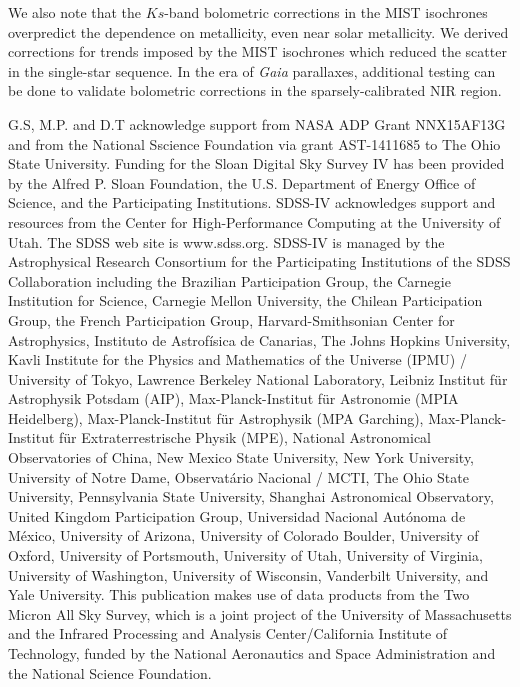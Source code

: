 \documentclass[twocolumn]{aastex6}
\newcommand{\Gaia}{\mbox{\textit{Gaia}}}
\begin{document}
We also note that the \(Ks\)-band bolometric corrections in the MIST 
isochrones overpredict the dependence on metallicity, even near solar 
metallicity. We derived corrections for trends imposed by the MIST isochrones 
which reduced the scatter in the single-star sequence. In the era of \Gaia{} 
parallaxes, additional testing can be done to validate bolometric corrections 
in the sparsely-calibrated NIR region.

\acknowledgments

G.S, M.P. and D.T acknowledge support from NASA ADP Grant NNX15AF13G and from
the National Sscience Foundation via grant AST-1411685 to The Ohio State
University. 
Funding for the Sloan Digital Sky Survey IV has been provided by the Alfred P.
Sloan Foundation, the U.S. Department of Energy Office of Science, and the
Participating Institutions. SDSS-IV acknowledges support and resources from the
Center for High-Performance Computing at the University of Utah. The SDSS web
site is www.sdss.org. SDSS-IV is managed by the Astrophysical Research
Consortium for the Participating Institutions of the SDSS Collaboration
including the Brazilian Participation Group, the Carnegie Institution for
Science, Carnegie Mellon University, the Chilean Participation Group, the
French Participation Group, Harvard-Smithsonian Center for Astrophysics,
Instituto de Astrof\'isica de Canarias, The Johns Hopkins University, Kavli
Institute for the Physics and Mathematics of the Universe (IPMU) / University
of Tokyo, Lawrence Berkeley National Laboratory, Leibniz Institut f\"ur
Astrophysik Potsdam (AIP), Max-Planck-Institut f\"ur Astronomie (MPIA
Heidelberg), Max-Planck-Institut f\"ur Astrophysik (MPA Garching),
Max-Planck-Institut f\"ur Extraterrestrische Physik (MPE), National
Astronomical Observatories of China, New Mexico State University, New York
University, University of Notre Dame, Observat\'ario Nacional / MCTI, The Ohio
State University, Pennsylvania State University, Shanghai Astronomical
Observatory, United Kingdom Participation Group, Universidad Nacional
Aut\'onoma de M\'exico, University of Arizona, University of Colorado Boulder,
University of Oxford, University of Portsmouth, University of Utah, University
of Virginia, University of Washington, University of Wisconsin, Vanderbilt
University, and Yale University.  This publication makes use of data products
from the Two Micron All Sky Survey, which is a joint project of the University
of Massachusetts and the Infrared Processing and Analysis Center/California
Institute of Technology, funded by the National Aeronautics and Space
Administration and the National Science Foundation. 



\onecolumngrid






\end{document}
